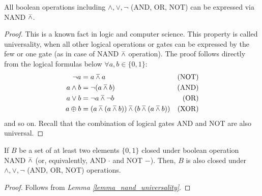 \begin{lemma}\label{lemma_nand_universality}
  All boolean operations including $\land, \lor, \neg$ (AND, OR, NOT) can be expressed via NAND $\barwedge$.
\end{lemma}
\begin{proof}
  This is a known fact in logic and computer science. This property is called universality, when all other logical operations or gates can be expressed by the few or one gate (as in case of NAND $\barwedge$ operation). The proof follows directly from the logical formulas below $\forall a,b \in \{0,1\}$:
  \begin{align*}
    \neg a     &= a \barwedge a & \text{(NOT)} \\
    a \land b  &= \neg(a \barwedge b) & \text{(AND)} \\
    a \lor b   &= \neg a \barwedge \neg b & \text{(OR)} \\
    a \oplus b &= (a \barwedge (a \barwedge b)) \barwedge (b \barwedge (a \barwedge b)) & \text{(XOR)}
  \end{align*}
  and so on. Recall that the combination of logical gates AND and NOT are also universal.
\end{proof}

\begin{corollary}\label{corollary_ba_from_nand}
  If $B$ be a set of at least two elements $\{0,1\}$ closed under boolean operation NAND $\barwedge$ (or, equivalently, AND $\cdot$ and NOT $-$).
  Then, $B$ is also closed under  $\land, \lor, \neg$ (AND, OR, NOT) operations.
\end{corollary}
\begin{proof}
  Follows from \textit{Lemma \ref{lemma_nand_universality}}.
\end{proof}

